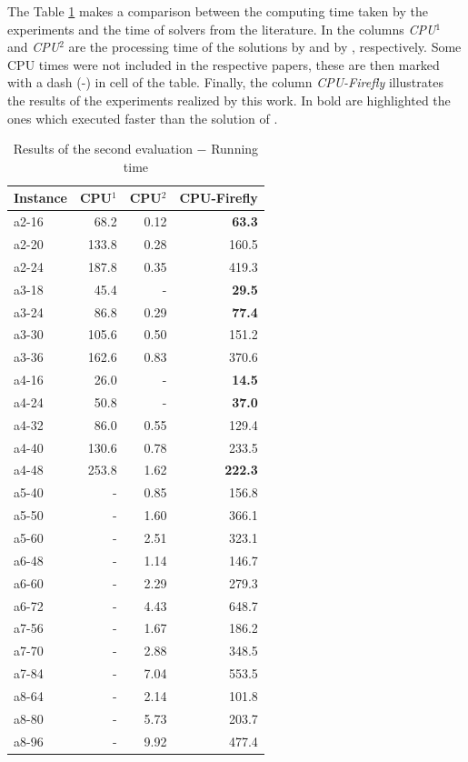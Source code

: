 \documentclass[tuberlin,cic,tc,openright,english,noabntcite,oneside]{iiufrgs}
\begin{document}
The Table \ref{tab:evaluation-2.2} makes a comparison between the computing time taken by the experiments and the time of solvers from the literature. In the columns \emph{CPU$^1$} and \emph{CPU$^2$} are the processing time of the solutions by \textcite{parragh_introducing_2011} and by \textcite{parragh_hybrid_2013}, respectively. Some CPU times were not included in the respective papers, these are then marked with a dash (-) in cell of the table. Finally, the column \emph{CPU-Firefly} illustrates the results of the experiments realized by this work. In bold are highlighted the ones which executed faster than the solution of \textcite{parragh_introducing_2011}.
\begin{table}[H]
\centering
\caption{Results of the second evaluation $-$ Running time}
\begin{tabular}{l | r | r | r}
\hline
Instance & CPU$^1$ & CPU$^2$ & CPU-Firefly\\
\hline
a2-16 & 	68.2 	& 	0.12 & 	\textbf{63.3} \\
a2-20 & 	133.8 	& 	0.28 & 	160.5 \\
a2-24 & 	187.8 	& 	0.35 & 	419.3 \\
a3-18 & 	45.4 	& 	- & 	\textbf{29.5} \\
a3-24 & 	86.8 	& 	0.29 & 	\textbf{77.4} \\
a3-30 & 	105.6 	& 	0.50 & 	151.2 \\
a3-36 & 	162.6 	& 	0.83 & 	370.6 \\
a4-16 & 	26.0 	& 	- & 	\textbf{14.5} \\
a4-24 & 	50.8 	& 	- & 	\textbf{37.0} \\
a4-32 & 	86.0 		& 	0.55 & 	129.4 \\
a4-40 & 	130.6 	& 	0.78 & 	233.5 \\
a4-48 & 	253.8 	& 	1.62 & 	\textbf{222.3} \\
a5-40 & 	- & 	0.85 & 	156.8 \\
a5-50 & 	- & 	1.60 & 	366.1 \\
a5-60 & 	- & 	2.51 & 	323.1 \\
a6-48 & 	- & 	1.14 & 	146.7 \\
a6-60 & 	- & 	2.29 & 	279.3 \\
a6-72 & 	- & 	4.43 & 	648.7 \\
a7-56 & 	- & 	1.67 & 	186.2 \\
a7-70 & 	- & 	2.88 & 	348.5 \\
a7-84 & 	- & 	7.04 & 	553.5 \\
a8-64 & 	- & 	2.14 & 	101.8 \\
a8-80 & 	- & 	5.73 & 	203.7 \\
a8-96 & 	- & 	9.92 & 	477.4 \\
\hline
\end{tabular}
\label{tab:evaluation-2.2}
\end{table}
\end{document}
